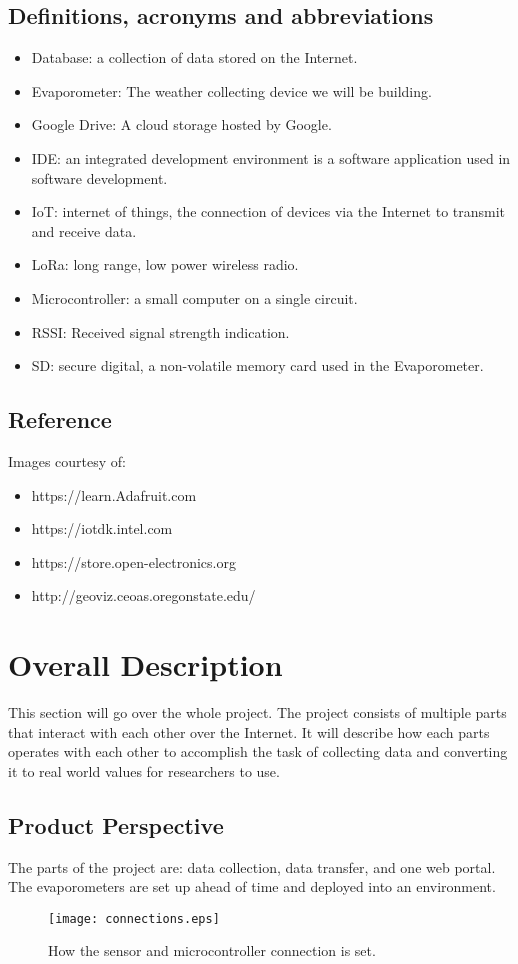 \documentclass[onecolumn, draftclsnofoot,10pt, compsoc]{IEEEtran}
\begin{document}
\subsection{Definitions, acronyms and abbreviations}
\begin{itemize}
\item Database: a collection of data stored on the Internet.
\item Evaporometer: The weather collecting device we will be building.
\item Google Drive: A cloud storage hosted by Google.
\item IDE: an integrated development environment is a software application used in software development.
\item IoT: internet of things, the connection of devices via the Internet to transmit and receive data.
\item LoRa: long range, low power wireless radio.
\item Microcontroller: a small computer on a single circuit.
\item RSSI: Received signal strength indication.

\item SD: secure digital, a non-volatile memory card used in the Evaporometer.


\end{itemize}
\subsection{Reference}
Images courtesy of:
\begin{itemize}
\item https://learn.Adafruit.com
\item https://iotdk.intel.com
\item https://store.open-electronics.org
\item http://geoviz.ceoas.oregonstate.edu/
\end{itemize}

\section{Overall Description}
This section will go over the whole project.  The project consists of multiple parts that interact with each other over the Internet.  It will describe how each parts operates with each other to accomplish the task of collecting data and converting it to real world values for researchers to use.
\subsection{Product Perspective}
The parts of the project are: data collection, data transfer, and one web portal.  The evaporometers are set up ahead of time and deployed into an environment.
\newline
\begin{figure}
 \caption{How the sensor and microcontroller connection is set.}
\texttt{[image: connections.eps]}
\end{figure}
\end{document}
